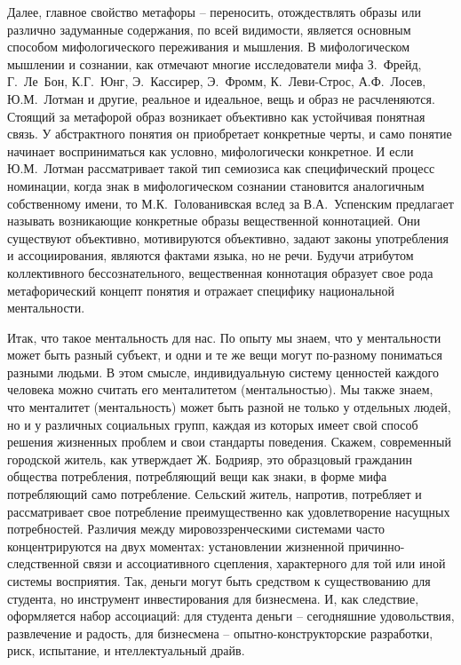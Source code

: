 Далее, главное свойство метафоры -- переносить, отождествлять образы или различно
задуманные содержания, по всей видимости, является основным способом мифологического
переживания и мышления. В мифологическом мышлении и сознании, как отмечают многие
исследователи мифа З.~Фрейд, Г.~Ле~Бон, К.Г.~Юнг, Э.~Кассирер, Э.~Фромм, К.~Леви-Строс,
А.Ф.~Лосев, Ю.М.~Лотман и другие, реальное и идеальное, вещь и образ не расчленяются.
Стоящий за метафорой образ возникает объективно как устойчивая понятная связь. У абстрактного
понятия он приобретает конкретные черты, и само понятие начинает восприниматься как условно,
мифологически конкретное. И если Ю.М.~Лотман рассматривает такой тип семиозиса как специфический
процесс номинации, когда знак в мифологическом сознании становится аналогичным собственному имени\autocite{name_culture},
то М.К.~Голованивская вслед за В.А.~Успенским предлагает называть возникающие конкретные образы
вещественной коннотацией.\autocite{uspensky} Они существуют объективно, мотивируются объективно,
задают законы употребления и ассоциирования, являются фактами языка, но не речи. Будучи атрибутом
коллективного бессознательного, вещественная коннотация образует свое рода метафорический концепт
понятия и отражает специфику национальной ментальности.

Итак, что такое ментальность для нас. По опыту мы знаем, что у ментальности может быть разный субъект,
и одни и те же вещи могут по-разному пониматься разными людьми. В этом смысле, индивидуальную
систему ценностей каждого человека можно считать его менталитетом (ментальностью). Мы также знаем,
что менталитет (ментальность) может быть разной не только у отдельных людей, но и у различных
социальных групп, каждая из которых имеет свой способ решения жизненных проблем и свои стандарты поведения.
Скажем, современный городской житель, как утверждает Ж. Бодрияр, это образцовый гражданин общества
потребления, потребляющий вещи как знаки, в форме мифа потребляющий само потребление.\autocite{bodriyar_society}
Сельский житель, напротив, потребляет и рассматривает свое потребление преимущественно как удовлетворение
насущных потребностей. Различия между мировоззренческими системами часто концентрируются на двух моментах:
установлении жизненной причинно-следственной связи и ассоциативного сцепления, характерного для той или
иной системы восприятия. Так, деньги могут быть средством к существованию для студента, но инструмент инвестирования
для бизнесмена. И, как следствие, оформляется набор ассоциаций: для студента деньги -- сегодняшние удовольствия,
развлечение и радость, для бизнесмена -- опытно-конструкторские разработки, риск, испытание, и
нтеллектуальный драйв.

